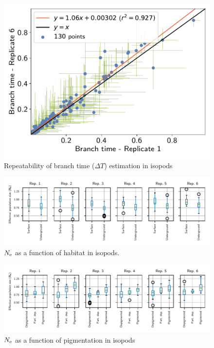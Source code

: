 \documentclass{article}
\begin{document}
\begin{figure}[H]
\begin{minipage}{0.32\linewidth}
			\includegraphics[width=\linewidth, page=1]{isopods/12CDS_SiteMutSelBranchNe_Rep-1-6_BranchTime}
		\end{minipage}
		\caption[Repeatability of branch time estimation in isopods]{Repeatability of branch time ($\Delta T$) estimation in isopods}
	\end{figure}

	\begin{figure}[H]
		\centering
		\includegraphics[width=\linewidth, page=1]{isopods/12CDS_SiteMutSelBranchNe_Rep_LogPopulationSize_eco}
		\caption[$\Ne$ as a function of habitat in isopods]{$\Ne$ as a function of habitat in isopods.}
	\end{figure}
	

	\begin{figure}[H]
		\centering
		\includegraphics[width=\linewidth, page=1]{isopods/12CDS_SiteMutSelBranchNe_Rep_LogPopulationSize_pig}
		\caption[$\Ne$ as a function of pigmentation in isopods]{$\Ne$ as a function of pigmentation in isopods}
	\end{figure}
	
\end{document}
